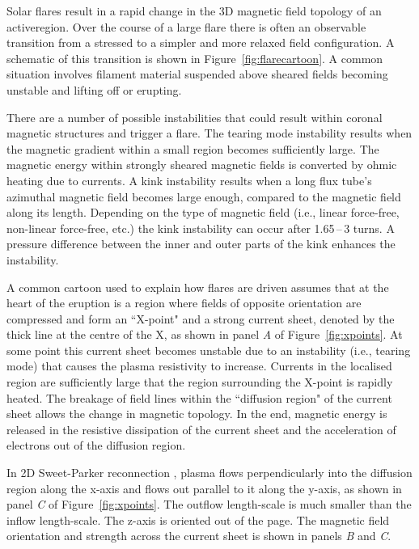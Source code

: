 Solar flares result in a rapid change in the 3D magnetic field topology of an \gls{activeregion}. Over the course of a large flare there is often an observable transition from a stressed to a simpler and more relaxed field configuration. A schematic of this transition is shown in Figure~\ref{fig:flarecartoon}. A common situation involves filament material suspended above sheared fields becoming unstable and lifting off or erupting. 

There are a number of possible instabilities that could result within coronal magnetic structures and trigger a flare. The tearing mode instability results when the magnetic gradient within a small region becomes sufficiently large. The magnetic energy within strongly sheared magnetic fields is converted by ohmic heating due to currents. A kink instability results when a long flux tube's azimuthal magnetic field becomes large enough, compared to the magnetic field along its length. Depending on the type of magnetic field (i.e., linear force-free, non-linear force-free, etc.) the kink instability can occur after 1.65\,--\,3 turns. A pressure difference between the inner and outer parts of the kink enhances the instability.

A common cartoon used to explain how flares are driven assumes that at the heart of the eruption is a region where fields of opposite orientation are compressed and form an ``X-point" and a strong current sheet, denoted by the thick line at the centre of the X, as shown in panel \emph{A} of Figure~\ref{fig:xpoints}. At some point this current sheet becomes unstable due to an instability (i.e., tearing mode) that causes the plasma resistivity to increase. Currents in the localised region are sufficiently large that the region surrounding the X-point is rapidly heated. The breakage of field lines within the ``diffusion region" of the current sheet allows the change in magnetic topology. In the end, magnetic energy is released in the resistive dissipation of the current sheet and the acceleration of electrons out of the diffusion region. 

In 2D Sweet-Parker reconnection \citep{Sweet:1958,Parker:1957b}, plasma flows perpendicularly into the diffusion region along the x-axis and flows out parallel to it along the y-axis, as shown in panel \emph{C} of Figure~\ref{fig:xpoints}. The outflow length-scale is much smaller than the inflow length-scale. The z-axis is oriented out of the page. The magnetic field orientation and strength across the current sheet is shown in panels \emph{B} and \emph{C}. 

